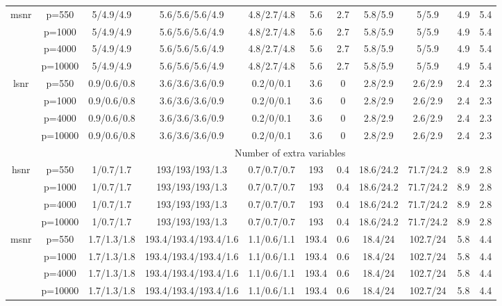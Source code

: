 \begin{table}[ht]
{\begin{tabular}{|c|c|ccccccccc|}
  \midrule\multirow{4}[2]{*}{msnr} & p=550 & 5/4.9/4.9 & 5.6/5.6/5.6/4.9 & 4.8/2.7/4.8 & 5.6 & 2.7 & 5.8/5.9 & 5/5.9 & 4.9 & 5.4 \\ 
   & p=1000 & 5/4.9/4.9 & 5.6/5.6/5.6/4.9 & 4.8/2.7/4.8 & 5.6 & 2.7 & 5.8/5.9 & 5/5.9 & 4.9 & 5.4 \\ 
   & p=4000 & 5/4.9/4.9 & 5.6/5.6/5.6/4.9 & 4.8/2.7/4.8 & 5.6 & 2.7 & 5.8/5.9 & 5/5.9 & 4.9 & 5.4 \\ 
   & p=10000 & 5/4.9/4.9 & 5.6/5.6/5.6/4.9 & 4.8/2.7/4.8 & 5.6 & 2.7 & 5.8/5.9 & 5/5.9 & 4.9 & 5.4 \\ 
  \midrule\multirow{4}[2]{*}{lsnr} & p=550 & 0.9/0.6/0.8 & 3.6/3.6/3.6/0.9 & 0.2/0/0.1 & 3.6 & 0 & 2.8/2.9 & 2.6/2.9 & 2.4 & 2.3 \\ 
   & p=1000 & 0.9/0.6/0.8 & 3.6/3.6/3.6/0.9 & 0.2/0/0.1 & 3.6 & 0 & 2.8/2.9 & 2.6/2.9 & 2.4 & 2.3 \\ 
   & p=4000 & 0.9/0.6/0.8 & 3.6/3.6/3.6/0.9 & 0.2/0/0.1 & 3.6 & 0 & 2.8/2.9 & 2.6/2.9 & 2.4 & 2.3 \\ 
   & p=10000 & 0.9/0.6/0.8 & 3.6/3.6/3.6/0.9 & 0.2/0/0.1 & 3.6 & 0 & 2.8/2.9 & 2.6/2.9 & 2.4 & 2.3 \\ 
   \midrule 
 \multicolumn{1}{|c}{} &       & \multicolumn{9}{c|}{Number of extra variables} \\
\midrule\multirow{4}[2]{*}{hsnr} & p=550 & 1/0.7/1.7 & 193/193/193/1.3 & 0.7/0.7/0.7 & 193 & 0.4 & 18.6/24.2 & 71.7/24.2 & 8.9 & 2.8 \\ 
   & p=1000 & 1/0.7/1.7 & 193/193/193/1.3 & 0.7/0.7/0.7 & 193 & 0.4 & 18.6/24.2 & 71.7/24.2 & 8.9 & 2.8 \\ 
   & p=4000 & 1/0.7/1.7 & 193/193/193/1.3 & 0.7/0.7/0.7 & 193 & 0.4 & 18.6/24.2 & 71.7/24.2 & 8.9 & 2.8 \\ 
   & p=10000 & 1/0.7/1.7 & 193/193/193/1.3 & 0.7/0.7/0.7 & 193 & 0.4 & 18.6/24.2 & 71.7/24.2 & 8.9 & 2.8 \\ 
  \midrule\multirow{4}[2]{*}{msnr} & p=550 & 1.7/1.3/1.8 & 193.4/193.4/193.4/1.6 & 1.1/0.6/1.1 & 193.4 & 0.6 & 18.4/24 & 102.7/24 & 5.8 & 4.4 \\ 
   & p=1000 & 1.7/1.3/1.8 & 193.4/193.4/193.4/1.6 & 1.1/0.6/1.1 & 193.4 & 0.6 & 18.4/24 & 102.7/24 & 5.8 & 4.4 \\ 
   & p=4000 & 1.7/1.3/1.8 & 193.4/193.4/193.4/1.6 & 1.1/0.6/1.1 & 193.4 & 0.6 & 18.4/24 & 102.7/24 & 5.8 & 4.4 \\ 
   & p=10000 & 1.7/1.3/1.8 & 193.4/193.4/193.4/1.6 & 1.1/0.6/1.1 & 193.4 & 0.6 & 18.4/24 & 102.7/24 & 5.8 & 4.4 \\ 

\end{tabular}}
\end{table}
